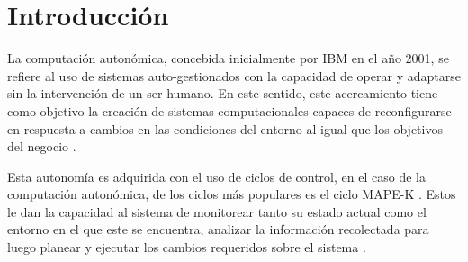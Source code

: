 \documentclass[12pt]{article}
\begin{document}
    
    
    \section{Introducción}


    La computación autonómica, concebida inicialmente por IBM en el año 2001, se refiere al uso de sistemas auto-gestionados con la capacidad de operar y adaptarse sin la intervención de un ser humano. En este sentido, este acercamiento tiene como objetivo la creación de sistemas computacionales capaces de reconfigurarse en respuesta a cambios en las condiciones del entorno al igual que los objetivos del negocio \cite{horn_2001}.

    Esta autonomía es adquirida con el uso de ciclos de control, en el caso de la computación autonómica, de los ciclos más populares es el ciclo MAPE-K \cite{Arcaini_2015}. Estos le dan la capacidad al sistema de monitorear tanto su estado actual como el entorno en el que este se encuentra, analizar la información recolectada para luego planear y ejecutar los cambios requeridos sobre el sistema \cite{RutanenKalle2018McoO}.
    



\end{document}

